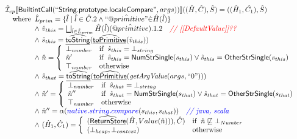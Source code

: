 \[
\begin{array}{l}

\hat{\mathcal{I}} _{cp}\llbracket \mbox{\textsf{BuiltintCall}}(``\mbox{\textsf{String.prototype.localeCompare}}",args))\rrbracket((\hat{H},\hat{C}), \hat{S})
  = ((\hat{H}_1, \hat{C_1}), \hat{S})\\
\quad{\rm where}\begin{array}[t]{l} 
  \hat{L}_{prim} = \{ \hat{l} \mid \hat{l} \in \hat{C}.2 \land ``\hat{@primitive}" \dot{\in}\hat{H}(\hat{l}) \}\\
  \land\ \hat{v}_{this} = \bigsqcup_{\hat{l} \in \hat{L}_{prim}} \hat{H}(\hat{l})(\hat{@primitive}).1.2
    \quad\textit{{\color{red}// [[DefaultValue]]??}}\\
  \land\ \hat{s}_{this} = \widehat{\underline{\sf toString}}(\widehat{\underline{\sf toPrimitive}}(\hat{v}_{this}))\\
  \land\ \hat{n} = \left\{\begin{array}{ll}
      \bot_{number} & {\rm if}\begin{array}[t]{l}\hat{s}_{this} = \bot_{string}\end{array}\\
      \hat{n}' & {\rm if}\begin{array}[t]{l}\hat{s}_{this} = \mbox{\textsf{NumStrSingle}}(s_{this}) \lor \hat{s}_{this} = \mbox{\textsf{OtherStrSingle}}(s_{this}) \end{array}\\
      \top_{number} & {\rm otherwise}
    \end{array}\right.\\
  \land\ \hat{s}_{that} = \widehat{\underline{\sf toString}}(\widehat{\underline{\sf toPrimitive}}(\emph{getArgValue}(args, ``0")))\\  
  \land\ \hat{n}' = \left\{\begin{array}{ll}
      \bot_{number} & {\rm if}\begin{array}[t]{l}\hat{s}_{that} = \bot_{string}\end{array}\\
      \hat{n}'' & {\rm if}\begin{array}[t]{l}\hat{s}_{that} = \mbox{\textsf{NumStrSingle}}(s_{that}) \lor \hat{s}_{that} = \mbox{\textsf{OtherStrSingle}}(s_{that}) \end{array}\\
      \top_{number} & {\rm otherwise}
    \end{array}\right.\\
  \land\ \hat{n}'' = \alpha({\color{blue} native.string.compare}(s_{this}, s_{that}))
    \quad\textit{{\color{blue}// java, scala}}\\  
  \land\ (\hat{H}_1, \hat{C}_1) = 
    \left\{\begin{array}{ll}
      (\widehat{\underline{\sf ReturnStore}}(\hat{H}, Value(\hat{n}))), \hat{C})
      & {\rm if}\begin{array}[t]{l}\hat{n} \not\sqsubseteq \bot_{Number}\end{array}\\
      (\bot_{heap}, \bot_{context}) & {\rm otherwise} \\
    \end{array}\right.
  \end{array}\\
\\\\



\end{array}\]
